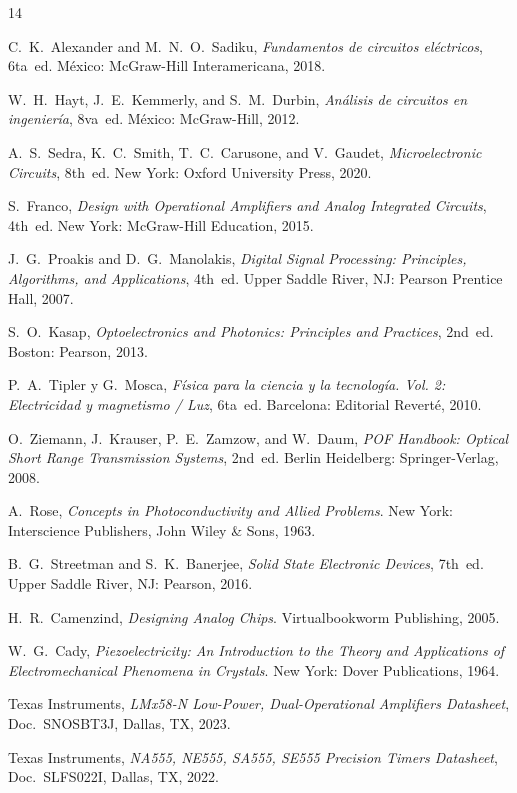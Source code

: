 \documentclass[journal,transmag]{IEEEtran}
\begin{document}
\begin{thebibliography}{14}

C.~K.~Alexander and M.~N.~O.~Sadiku, \emph{Fundamentos de circuitos eléctricos}, 6ta~ed. México: McGraw-Hill Interamericana, 2018.

W.~H.~Hayt, J.~E.~Kemmerly, and S.~M.~Durbin, \emph{Análisis de circuitos en ingeniería}, 8va~ed. México: McGraw-Hill, 2012.

A.~S.~Sedra, K.~C.~Smith, T.~C.~Carusone, and V.~Gaudet, \emph{Microelectronic Circuits}, 8th~ed. New York: Oxford University Press, 2020.

S.~Franco, \emph{Design with Operational Amplifiers and Analog Integrated Circuits}, 4th~ed. New York: McGraw-Hill Education, 2015.

J.~G.~Proakis and D.~G.~Manolakis, \emph{Digital Signal Processing: Principles, Algorithms, and Applications}, 4th~ed. Upper Saddle River, NJ: Pearson Prentice Hall, 2007.

S.~O.~Kasap, \emph{Optoelectronics and Photonics: Principles and Practices}, 2nd~ed. Boston: Pearson, 2013.

P.~A.~Tipler y G.~Mosca, \emph{Física para la ciencia y la tecnología. Vol. 2: Electricidad y magnetismo / Luz}, 6ta~ed. Barcelona: Editorial Reverté, 2010.

O.~Ziemann, J.~Krauser, P.~E.~Zamzow, and W.~Daum, \emph{POF Handbook: Optical Short Range Transmission Systems}, 2nd~ed. Berlin Heidelberg: Springer-Verlag, 2008.

A.~Rose, \emph{Concepts in Photoconductivity and Allied Problems}. New York: Interscience Publishers, John Wiley \& Sons, 1963.

B.~G.~Streetman and S.~K.~Banerjee, \emph{Solid State Electronic Devices}, 7th~ed. Upper Saddle River, NJ: Pearson, 2016.

H.~R.~Camenzind, \emph{Designing Analog Chips}. Virtualbookworm Publishing, 2005.

W.~G.~Cady, \emph{Piezoelectricity: An Introduction to the Theory and Applications of Electromechanical Phenomena in Crystals}. New York: Dover Publications, 1964.

Texas Instruments, \emph{LMx58-N Low-Power, Dual-Operational Amplifiers Datasheet}, Doc.~SNOSBT3J, Dallas, TX, 2023.

Texas Instruments, \emph{NA555, NE555, SA555, SE555 Precision Timers Datasheet}, Doc.~SLFS022I, Dallas, TX, 2022.

\end{thebibliography}
\end{document}
